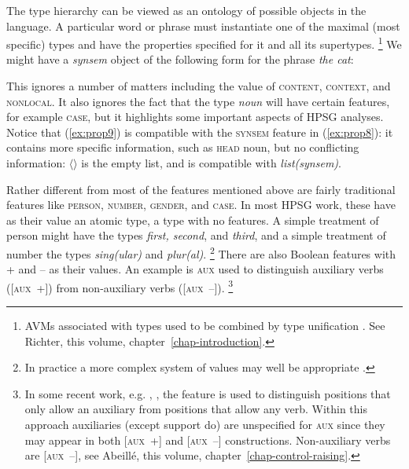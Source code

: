 \documentclass[output=paper
	        ,collection
	        ,collectionchapter
 	        ,biblatex
                ,babelshorthands
                ,newtxmath
                ,draftmode
                ,colorlinks, citecolor=brown
]{langscibook}
\begin{document}
The type hierarchy can be viewed as an ontology of possible objects in the language. A particular word or phrase must instantiate one of the maximal (most specific) types and have the properties specified for it and all its supertypes.%
%
\footnote{AVMs associated with types used to be combined by type unification \citep{ps}. See Richter, this volume, chapter~\ref{chap-introduction}.}
%
We might have a \emph{synsem} object of the following form for the phrase \emph{the cat}:

\ea\label{ex:prop9}
\z

This ignores a number of matters including the value of \textsc{content, context}, and \textsc{nonlocal}. It also ignores the fact that the type \emph{noun} will have certain features, for example \textsc{case}, but it highlights some important aspects of HPSG analyses. Notice that (\ref{ex:prop9}) is compatible with the \textsc{synsem} feature in (\ref{ex:prop8}): it contains more specific information, such as \textsc{head} noun, but no conflicting information: $\langle \rangle$ is the empty list, and is compatible with \emph{list(synsem)}.

Rather different from most of the features mentioned above are fairly traditional features like \textsc{person, number, gender}, and \textsc{case}. In most HPSG work, these have as their value an atomic type, a type with no features. A simple treatment of person might have the types \emph{first, second}, and \emph{third}, and a simple treatment of number the types \emph{sing(ular)} and \emph{plur(al)}.%
%
\footnote{In practice a more complex system of values may well be appropriate \citep{Flickinger2000a}.}
%
There are also Boolean features with + and – as their values. An example is \textsc{aux} used to distinguish auxiliary verbs ([\textsc{aux}~+]) from non-auxiliary verbs ([\textsc{aux}~–]).%
%
\footnote{In some recent work, e.g. \citet[157--162]{Sag2012a}, \citet{Sag2020a}, the feature is used to distinguish positions that only allow an auxiliary from positions that allow any verb. Within this approach auxiliaries (except support do) are unspecified for \textsc{aux} since they may appear in both [\textsc{aux}~+] and [\textsc{aux}~–] constructions. Non-auxiliary verbs are [\textsc{aux}~–], see Abeillé, this volume, chapter~\ref{chap-control-raising}.}
%
\end{document}
